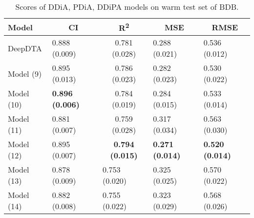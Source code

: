 \begin{table}
\centering
\caption{Scores of DDiA, PDiA, DDiPA models on warm test set of BDB.}
\vspace{0.25em}
\begin{tabular}{|l|l|c|l|l|} 
\hline
Model & \multicolumn{1}{c|}{CI} & R\textsuperscript{2} & \multicolumn{1}{c|}{MSE} & \multicolumn{1}{c|}{RMSE} \\ 
\hline
DeepDTA & 0.888 (0.009) & 0.781 (0.028) & 0.288 (0.021) & 0.536 (0.012) \\ 
\hline
Model (9) & 0.895 (0.013) & 0.786 (0.023) & 0.282 (0.023) & 0.530 (0.022) \\ 
\hline
Model (10) & \textbf{0.896 (0.006)} & 0.784 (0.019) & 0.284 (0.015) & 0.533 (0.014) \\ 
\hline
Model (11) & 0.881 (0.007) & 0.759 (0.028) & 0.317 (0.034) & 0.563 (0.030) \\ 
\hline
Model (12) & 0.895 (0.007) & \textbf{0.794 (0.015)} & \textbf{0.271 (0.014)} & \textbf{0.520 (0.014)} \\ 
\hline
Model (13) & 0.878 (0.009) & \multicolumn{1}{l|}{0.753 (0.020)} & 0.325 (0.025) & 0.570 (0.022) \\ 
\hline
Model (14) & 0.882 (0.008) & \multicolumn{1}{l|}{0.755 (0.022)} & 0.323 (0.029) & 0.568 (0.026) \\
\hline
\end{tabular}
\label{tab:disease_warm}
\end{table}